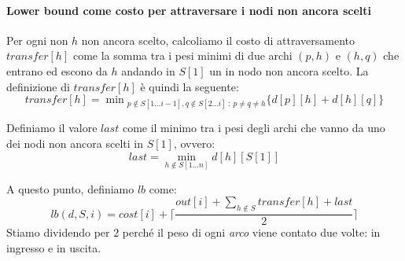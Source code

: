 \paragraph{Lower bound come costo per attraversare i nodi non ancora scelti}
\begin{definition}
    Per ogni non $h$ non ancora scelto, calcoliamo il costo di attraversamento
    $transfer[h]$ come la somma tra i pesi minimi di due archi $(p,h)$ e $(h,q)$
    che entrano ed escono da $h$ andando in $S[1]$ un in nodo non ancora scelto.
    La definizione di $transfer[h]$ è quindi la seguente:
    \[transfer[h]=\min{}_{p\notin S[1\dots i-1],q\notin S[2\dots i]\::\:p\neq
    q\neq h}\{d[p][h]+d[h][q]\}\]
\end{definition}
\begin{definition}
    Definiamo il valore $last$ come il minimo tra i pesi degli archi che vanno
    da uno dei nodi non ancora scelti in $S[1]$, ovvero:
    \[last=\min_{h\notin S[1\dots n]}d[h][S[1]]\]
\end{definition}

\noindent
A questo punto, definiamo $lb$ come:
\[lb(d,S,i)=cost[i]+\lceil\frac{out[i]+\sum_{h\notin S}transfer[h]+last}{2}\rceil\]
Stiamo dividendo per $2$ perché il peso di ogni \emph{arco} viene contato due volte:
in ingresso e in uscita.

